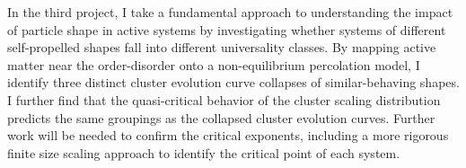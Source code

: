 In the third project, I take a fundamental approach to understanding the impact of particle shape in active systems by investigating whether systems of different self-propelled shapes fall into different universality classes. By mapping active matter near the order-disorder onto a non-equilibrium percolation model, I identify three distinct cluster evolution curve collapses of similar-behaving shapes. I further find that the quasi-critical behavior of the cluster scaling distribution predicts the same groupings as the collapsed cluster evolution curves. Further work will be needed to confirm the critical exponents, including a more rigorous finite size scaling approach to identify the critical point of each system.


